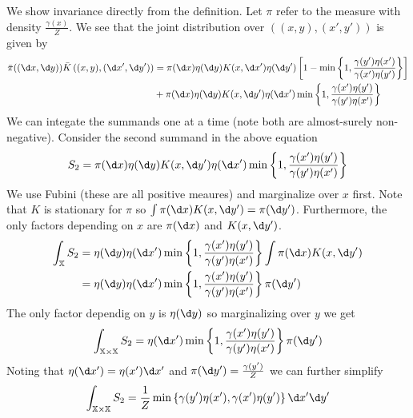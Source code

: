 \documentclass{article}
\begin{document}
\begin{enumerate}
        We show invariance directly from the definition. Let 
        $\pi$ refer to the measure with density $\frac{\gamma(x)}{Z}$. We
        see that the joint distribution over $((x, y),(x', y'))$ is given by
        \begin{align}
            \bar \pi ((\d x,\d y))\bar K \left((x,y),(\d x', \d y')\right) &=
            \pi(\d x)\eta(\d y)
            K(x,\d x')\eta(\d y')
            \left[1 - \min\left\{1, \frac{\gamma(y')\eta(x')}{\gamma(x')\eta(y')}\right\}\right] \\
            &+ 
            \pi(\d x)\eta(\d y)K(x,\d y')\eta(\d x')
            \min\left\{1, \frac{\gamma(x')\eta(y')}{\gamma(y')\eta(x')} \right\} 
        \end{align}
        We can integate the summands one at a time (note both are almost-surely
        non-negative). Consider the second summand in the above equation
        \begin{align}
            S_2 = \pi (\d x)\eta(\d y) K(x, \d y') \eta(\d x')  \min\left\{1, \frac{\gamma(x')\eta(y')}{\gamma(y')\eta(x')} \right\} \\
        \end{align}
        We use Fubini (these are all positive meaures)
        and marginalize over $x$ first. Note that $K$ is stationary
        for $\pi$ so $\int \pi(\d x)K(x,\d y') = \pi(\d y')$.
        Furthermore, the only factors depending on $x$ are $\pi(\d x)$ and
        $K(x, \d y')$.
        \begin{align}
            \int_{\mathbb X} S_2 &= 
            \eta(\d y)\eta(\d x') \min\left\{1, \frac{\gamma(x')\eta(y')}{\gamma(y')\eta(x')} \right\} 
            \int \pi(\d x)K(x, \d y') \\ 
            &=  \eta(\d y)\eta(\d x') \min\left\{1, \frac{\gamma(x')\eta(y')}{\gamma(y')\eta(x')} \right\}
                \pi(\d y')
        \end{align} 
        The only factor dependig on $y$ is $\eta (\d y)$ so marginalizing over
        $y$ we get 
        \[
            \int_{\mathbb X \times \mathbb X} S_2 = 
                \eta(\d x') \min\left\{1, \frac{\gamma(x')\eta(y')}{\gamma(y')\eta(x')} \right\}
                \pi(\d y')
        \]
        Noting that $\eta(\d x ') = \eta(x') \d x'$ and
        $\pi (\d y') = \frac{\gamma(y')}{Z}$ we can further simplify
        \begin{align}
            \int_{\mathbb X \times \mathbb X} S_2 =
                \frac 1 Z \min\left\{\gamma(y')\eta(x'), \gamma(x')\eta(y') \right\} \d x' \d y'

\end{align}
\end{enumerate}
\end{document}
